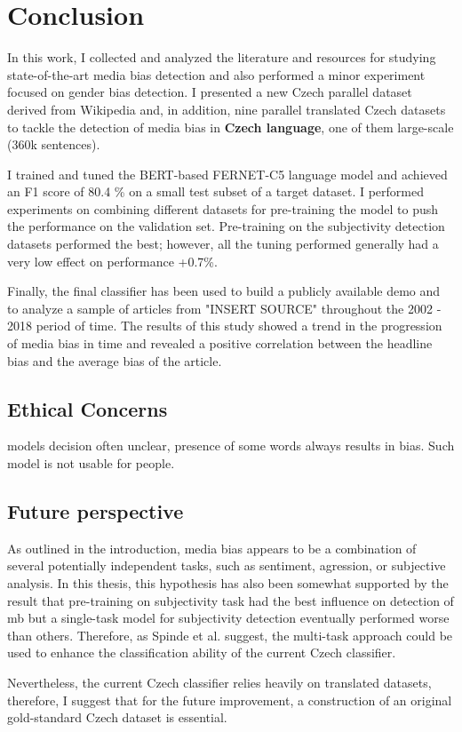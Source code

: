 \chapter{Conclusion}
In this work, I collected and analyzed the literature and resources for studying state-of-the-art media bias detection and also performed a minor experiment focused on gender bias detection. I presented a new Czech parallel dataset derived from Wikipedia and, in addition, nine parallel translated Czech datasets to tackle the detection of media bias in \textbf{Czech language}, one of them large-scale (360k sentences).

I trained and tuned the BERT-based FERNET-C5 language model and achieved an F1 score of 80.4 \% on a small test subset of a target dataset. I performed experiments on combining different datasets for pre-training the model to push the performance on the validation set. Pre-training on the subjectivity detection datasets performed the best; however, all the tuning performed generally had a very low effect on performance +0.7\%. 

Finally, the final classifier has been used to build a publicly available demo and to analyze a sample of articles from "INSERT SOURCE" throughout the 2002 - 2018 period of time. The results of this study showed a trend in the progression of media bias in time and revealed a positive correlation between the headline bias and the average bias of the article.

\section{Ethical Concerns}
models decision often unclear, presence of some words always results in bias. Such model is not usable for people.


\section{Future perspective}
As outlined in the introduction, media bias appears to be a combination of several potentially independent tasks, such as sentiment, agression, or subjective analysis. In this thesis, this hypothesis has also been somewhat supported by the result that pre-training on subjectivity task had the best influence on detection of \gls{mb} but a single-task model for subjectivity detection eventually performed worse than others. Therefore, as Spinde et al. \cite{spindeexploiting} suggest, the multi-task approach could be used to enhance the classification ability of the current Czech classifier.

Nevertheless, the current Czech classifier relies heavily on translated datasets, therefore, I suggest that for the future improvement, a construction of an original gold-standard Czech dataset is essential.
